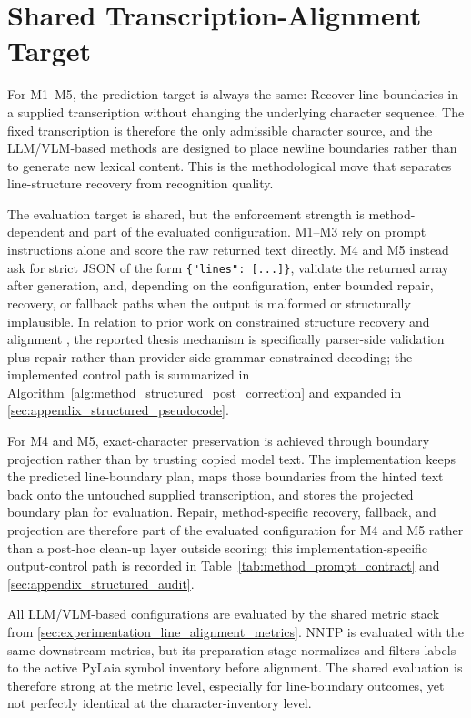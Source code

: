 \section{Shared Transcription-Alignment Target}
\label{sec:method_common_contract}

For M1--M5, the prediction target is always the same: Recover line boundaries in a supplied transcription without changing the underlying character sequence. The fixed transcription is therefore the only admissible character source, and the LLM/VLM-based methods are designed to place newline boundaries rather than to generate new lexical content. This is the methodological move that separates line-structure recovery from recognition quality.

The evaluation target is shared, but the enforcement strength is method-dependent and part of the evaluated configuration. M1--M3 rely on prompt instructions alone and score the raw returned text directly. M4 and M5 instead ask for strict JSON of the form \texttt{\{"lines": [...]\}}, validate the returned array after generation, and, depending on the configuration, enter bounded repair, recovery, or fallback paths when the output is malformed or structurally implausible. In relation to prior work on constrained structure recovery and alignment , the reported thesis mechanism is specifically parser-side validation plus repair rather than provider-side grammar-constrained decoding; the implemented control path is summarized in Algorithm~\ref{alg:method_structured_post_correction} and expanded in \autoref{sec:appendix_structured_pseudocode}.

For M4 and M5, exact-character preservation is achieved through boundary projection rather than by trusting copied model text. The implementation keeps the predicted line-boundary plan, maps those boundaries from the hinted text back onto the untouched supplied transcription, and stores the projected boundary plan for evaluation. Repair, method-specific recovery, fallback, and projection are therefore part of the evaluated configuration for M4 and M5 rather than a post-hoc clean-up layer outside scoring; this implementation-specific output-control path is recorded in Table~\ref{tab:method_prompt_contract} and \autoref{sec:appendix_structured_audit}.

All LLM/VLM-based configurations are evaluated by the shared metric stack from \autoref{sec:experimentation_line_alignment_metrics}. NNTP is evaluated with the same downstream metrics, but its preparation stage normalizes and filters labels to the active PyLaia symbol inventory before alignment. The shared evaluation is therefore strong at the metric level, especially for line-boundary outcomes, yet not perfectly identical at the character-inventory level.

